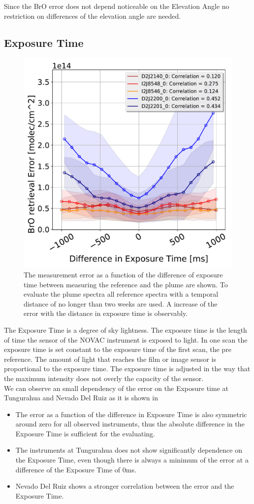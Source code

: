 Since the BrO error does not depend noticeable on the Elevation Angle no restriction on differences of the elevation angle are needed.
\subsection{Exposure Time}
\begin{figure}
	\centering
	\includegraphics[width=0.7\linewidth]{Bilder/DiffExpTimeallInstruments}
	\caption{The   measurement error as a function of the difference of exposure time between measuring the reference and the plume are shown. To evaluate the plume spectra all reference spectra with a temporal distance of no longer than two weeks are used. A increase of the  error with the distance in exposure time is observably.}
	\label{fig:diffexptime}
\end{figure}
The Exposure Time is a degree of sky lightness. The  exposure time is the length of time the sensor of the NOVAC instrument is exposed to light. In one scan the exposure time is set constant to the exposure time of the first scan, the pre reference. The amount of light that reaches the film or image sensor is proportional to the exposure time. The exposure time is adjusted in the way that the maximum intensity does not overly the capacity of the sensor.\\
We can observe an small dependency of the  error on the Exposure time at Tungurahua and Nevado Del Ruiz as it is shown in 
\begin{itemize}
	\item The   error as a function of the difference in Exposure Time is also symmetric around zero for all observed instruments, thus the absolute difference in the Exposure Time is sufficient for the evaluating.
	\item The instruments at Tungurahua does not show significantly dependence on the Exposure Time, even though there is always a minimum of the  error at a difference of the Exposure Time of 0ms.
	\item Nevado Del Ruiz shows a stronger correlation between the   error and the Exposure Time.
\end{itemize}
